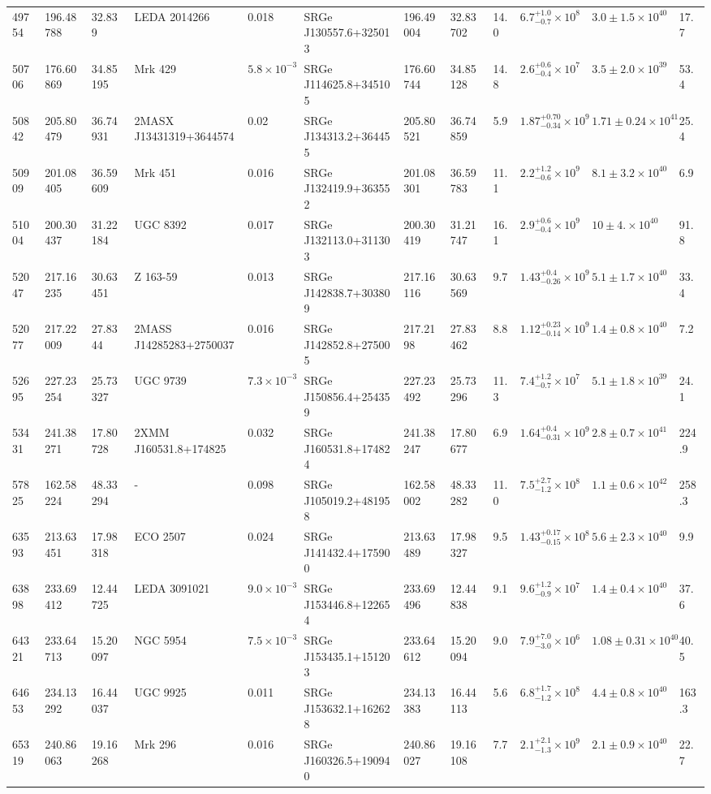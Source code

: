 \begin{longtable}{llllllllllll}
49754 & 196.48788 & 32.839 & LEDA 2014266 & 0.018 & SRGe J130557.6+325013 & 196.49004 & 32.83702 & 14.0 & $6.7^{+1.0}_{-0.7}\times10^{8}$ & $3.0\pm1.5\times10^{40}$ & 17.7 \\
50706 & 176.60869 & 34.85195 & Mrk  429 & $5.8\times10^{-3}$ & SRGe J114625.8+345105 & 176.60744 & 34.85128 & 14.8 & $2.6^{+0.6}_{-0.4}\times10^{7}$ & $3.5\pm2.0\times10^{39}$ & 53.4 \\
50842 & 205.80479 & 36.74931 & 2MASX J13431319+3644574 & 0.02 & SRGe J134313.2+364455 & 205.80521 & 36.74859 & 5.9 & $1.87^{+0.70}_{-0.34}\times10^{9}$ & $1.71\pm0.24\times10^{41}$ & 25.4 \\
50909 & 201.08405 & 36.59609 & Mrk  451 & 0.016 & SRGe J132419.9+363552 & 201.08301 & 36.59783 & 11.1 & $2.2^{+1.2}_{-0.6}\times10^{9}$ & $8.1\pm3.2\times10^{40}$ & 6.9 \\
51004 & 200.30437 & 31.22184 & UGC  8392 & 0.017 & SRGe J132113.0+311303 & 200.30419 & 31.21747 & 16.1 & $2.9^{+0.6}_{-0.4}\times10^{9}$ & $10\pm4.\times10^{40}$ & 91.8 \\
52047 & 217.16235 & 30.63451 & Z 163-59 & 0.013 & SRGe J142838.7+303809 & 217.16116 & 30.63569 & 9.7 & $1.43^{+0.4}_{-0.26}\times10^{9}$ & $5.1\pm1.7\times10^{40}$ & 33.4 \\
52077 & 217.22009 & 27.8344 & 2MASS J14285283+2750037 & 0.016 & SRGe J142852.8+275005 & 217.2198 & 27.83462 & 8.8 & $1.12^{+0.23}_{-0.14}\times10^{9}$ & $1.4\pm0.8\times10^{40}$ & 7.2 \\
52695 & 227.23254 & 25.73327 & UGC  9739 & $7.3\times10^{-3}$ & SRGe J150856.4+254359 & 227.23492 & 25.73296 & 11.3 & $7.4^{+1.2}_{-0.7}\times10^{7}$ & $5.1\pm1.8\times10^{39}$ & 24.1 \\
53431 & 241.38271 & 17.80728 & 2XMM J160531.8+174825 & 0.032 & SRGe J160531.8+174824 & 241.38247 & 17.80677 & 6.9 & $1.64^{+0.4}_{-0.31}\times10^{9}$ & $2.8\pm0.7\times10^{41}$ & 224.9 \\
57825 & 162.58224 & 48.33294 & - & 0.098 & SRGe J105019.2+481958 & 162.58002 & 48.33282 & 11.0 & $7.5^{+2.7}_{-1.2}\times10^{8}$ & $1.1\pm0.6\times10^{42}$ & 258.3 \\
63593 & 213.63451 & 17.98318 & ECO 2507 & 0.024 & SRGe J141432.4+175900 & 213.63489 & 17.98327 & 9.5 & $1.43^{+0.17}_{-0.15}\times10^{8}$ & $5.6\pm2.3\times10^{40}$ & 9.9 \\
63898 & 233.69412 & 12.44725 & LEDA 3091021 & $9.0\times10^{-3}$ & SRGe J153446.8+122654 & 233.69496 & 12.44838 & 9.1 & $9.6^{+1.2}_{-0.9}\times10^{7}$ & $1.4\pm0.4\times10^{40}$ & 37.6 \\
64321 & 233.64713 & 15.20097 & NGC  5954 & $7.5\times10^{-3}$ & SRGe J153435.1+151203 & 233.64612 & 15.20094 & 9.0 & $7.9^{+7.0}_{-3.0}\times10^{6}$ & $1.08\pm0.31\times10^{40}$ & 40.5 \\
64653 & 234.13292 & 16.44037 & UGC  9925 & 0.011 & SRGe J153632.1+162628 & 234.13383 & 16.44113 & 5.6 & $6.8^{+1.7}_{-1.2}\times10^{8}$ & $4.4\pm0.8\times10^{40}$ & 163.3 \\
65319 & 240.86063 & 19.16268 & Mrk  296 & 0.016 & SRGe J160326.5+190940 & 240.86027 & 19.16108 & 7.7 & $2.1^{+2.1}_{-1.3}\times10^{9}$ & $2.1\pm0.9\times10^{40}$ & 22.7 \\



\end{longtable}
